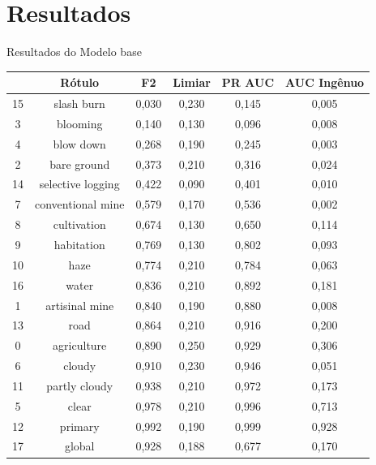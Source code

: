 \documentclass[8pt]{beamer}
\begin{document}
\section{Resultados} 
\begin{frame}{Resultados do Modelo base}
    \centering
    \fontsize{6pt}{7pt}\selectfont
    \begin{tabular}{*{6}{c}}
        \hline
        {} &              Rótulo &  F2    &  Limiar   &  PR AUC &  AUC Ingênuo \\
        \hline
        15 &         slash burn &  0,030 &      0,230 &   0,145 &       0,005 \\
        3  &           blooming &  0,140 &      0,130 &   0,096 &       0,008 \\
        4  &          blow down &  0,268 &      0,190 &   0,245 &       0,003 \\
        2  &        bare ground &  0,373 &      0,210 &   0,316 &       0,024 \\
        14 &  selective logging &  0,422 &      0,090 &   0,401 &       0,010 \\
        7  &  conventional mine &  0,579 &      0,170 &   0,536 &       0,002 \\
        8  &        cultivation &  0,674 &      0,130 &   0,650 &       0,114 \\
        9  &         habitation &  0,769 &      0,130 &   0,802 &       0,093 \\
        10 &               haze &  0,774 &      0,210 &   0,784 &       0,063 \\
        16 &              water &  0,836 &      0,210 &   0,892 &       0,181 \\
        1  &     artisinal mine &  0,840 &      0,190 &   0,880 &       0,008 \\
        13 &               road &  0,864 &      0,210 &   0,916 &       0,200 \\
        0  &        agriculture &  0,890 &      0,250 &   0,929 &       0,306 \\
        6  &             cloudy &  0,910 &      0,230 &   0,946 &       0,051 \\
        11 &      partly cloudy &  0,938 &      0,210 &   0,972 &       0,173 \\
        5  &              clear &  0,978 &      0,210 &   0,996 &       0,713 \\
        12 &            primary &  0,992 &      0,190 &   0,999 &       0,928 \\
        17 &             global &  0,928 &      0,188 &   0,677 &       0,170 \\
        \hline
    \end{tabular}    
\end{frame}  
\end{document}
